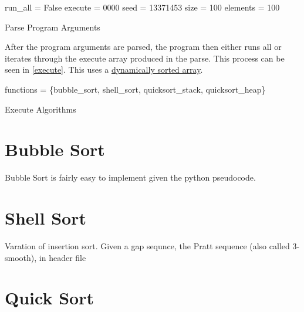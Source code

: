 \documentclass[12pt]{article}
\begin{document}
    \begin{algorithm}
        run\_all = False\;
		execute = 0000
        seed = 13371453
        size = 100
        elements = 100

        \caption{Parse Program Arguments}\label{parse}
    \end{algorithm}

    After the program arguments are parsed, the program then either runs all or iterates through the execute array produced in the parse. This process can be seen in \vref{execute}. 
    This uses a \href{https://www.geeksforgeeks.org/dynamic-memory-allocation-in-c-using-malloc-calloc-free-and-realloc/}{dynamically sorted array}.

    \begin{algorithm}
		functions = \{bubble\_sort, shell\_sort, quicksort\_stack, quicksort\_heap\}\;

        \caption{Execute Algorithms}\label{execute}
    \end{algorithm}

    \section{Bubble Sort}

    Bubble Sort is fairly easy to implement given the python pseudocode.

    \section{Shell Sort}

    Varation of insertion sort.
    Given a gap sequnce, the Pratt sequence (also called 3-smooth), in header file
    \section{Quick Sort}
\end{document}
